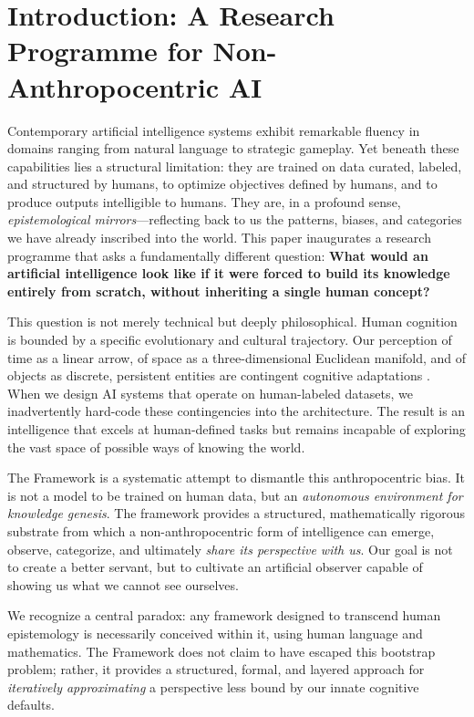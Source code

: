 \section{Introduction: A Research Programme for Non-Anthropocentric AI}
\label{sec:intro}

Contemporary artificial intelligence systems exhibit remarkable fluency in domains ranging from natural language to strategic gameplay. Yet beneath these capabilities lies a structural limitation: they are trained on data curated, labeled, and structured by humans, to optimize objectives defined by humans, and to produce outputs intelligible to humans. They are, in a profound sense, \emph{epistemological mirrors}---reflecting back to us the patterns, biases, and categories we have already inscribed into the world. This paper inaugurates a research programme that asks a fundamentally different question: \textbf{What would an artificial intelligence look like if it were forced to build its knowledge entirely from scratch, without inheriting a single human concept?}

This question is not merely technical but deeply philosophical. Human cognition is bounded by a specific evolutionary and cultural trajectory. Our perception of time as a linear arrow, of space as a three-dimensional Euclidean manifold, and of objects as discrete, persistent entities are contingent cognitive adaptations \cite{nagel1974, barad2007}. When we design AI systems that operate on human-labeled datasets, we inadvertently hard-code these contingencies into the architecture. The result is an intelligence that excels at human-defined tasks but remains incapable of exploring the vast space of possible ways of knowing the world.

The \Apeiron{} Framework is a systematic attempt to dismantle this anthropocentric bias. It is not a model to be trained on human data, but an \emph{autonomous environment for knowledge genesis}. The framework provides a structured, mathematically rigorous substrate from which a non-anthropocentric form of intelligence can emerge, observe, categorize, and ultimately \emph{share its perspective with us}. Our goal is not to create a better servant, but to cultivate an artificial observer capable of showing us what we cannot see ourselves.

We recognize a central paradox: any framework designed to transcend human epistemology is necessarily conceived within it, using human language and mathematics. The \Apeiron{} Framework does not claim to have escaped this bootstrap problem; rather, it provides a structured, formal, and layered approach for \emph{iteratively approximating} a perspective less bound by our innate cognitive defaults.


